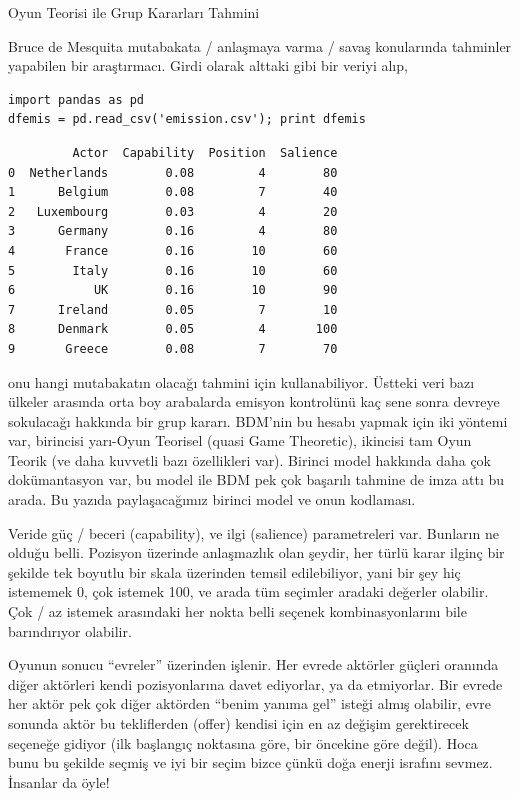\documentclass[12pt,fleqn]{article}\usepackage{../../common}
\begin{document}
Oyun Teorisi ile Grup Kararları Tahmini

Bruce de Mesquita mutabakata / anlaşmaya varma / savaş konularında tahminler
yapabilen bir araştırmacı. Girdi olarak alttaki gibi bir veriyi alıp,

\begin{verbatim}
import pandas as pd
dfemis = pd.read_csv('emission.csv'); print dfemis
\end{verbatim}

\begin{verbatim}
         Actor  Capability  Position  Salience
0  Netherlands        0.08         4        80
1      Belgium        0.08         7        40
2   Luxembourg        0.03         4        20
3      Germany        0.16         4        80
4       France        0.16        10        60
5        Italy        0.16        10        60
6           UK        0.16        10        90
7      Ireland        0.05         7        10
8      Denmark        0.05         4       100
9       Greece        0.08         7        70
\end{verbatim}

onu hangi mutabakatın olacağı tahmini için kullanabiliyor. Üstteki veri bazı
ülkeler arasında orta boy arabalarda emisyon kontrolünü kaç sene sonra devreye
sokulacağı hakkında bir grup kararı. BDM'nin bu hesabı yapmak için iki yöntemi
var, birincisi yarı-Oyun Teorisel (quasi Game Theoretic), ikincisi tam Oyun
Teorik (ve daha kuvvetli bazı özellikleri var). Birinci model hakkında daha çok
dokümantasyon var, bu model ile BDM pek çok başarılı tahmine de imza attı bu
arada. Bu yazıda paylaşacağımız birinci model ve onun kodlaması.

Veride güç / beceri (capability), ve ilgi (salience) parametreleri var. Bunların
ne olduğu belli. Pozisyon üzerinde anlaşmazlık olan şeydir, her türlü karar
ilginç bir şekilde tek boyutlu bir skala üzerinden temsil edilebiliyor, yani bir
şey hiç istememek 0, çok istemek 100, ve arada tüm seçimler aradaki değerler
olabilir. Çok / az istemek arasındaki her nokta belli seçenek kombinasyonlarını
bile barındırıyor olabilir.

Oyunun sonucu ``evreler'' üzerinden işlenir. Her evrede aktörler güçleri
oranında diğer aktörleri kendi pozisyonlarına davet ediyorlar, ya da
etmiyorlar. Bir evrede her aktör pek çok diğer aktörden ``benim yanıma gel''
isteği almış olabilir, evre sonunda aktör bu tekliflerden (offer) kendisi için
en az değişim gerektirecek seçeneğe gidiyor (ilk başlangıç noktasına göre, bir
öncekine göre değil). Hoca bunu bu şekilde seçmiş ve iyi bir seçim bizce çünkü
doğa enerji israfını sevmez. İnsanlar da öyle!
\end{document}
